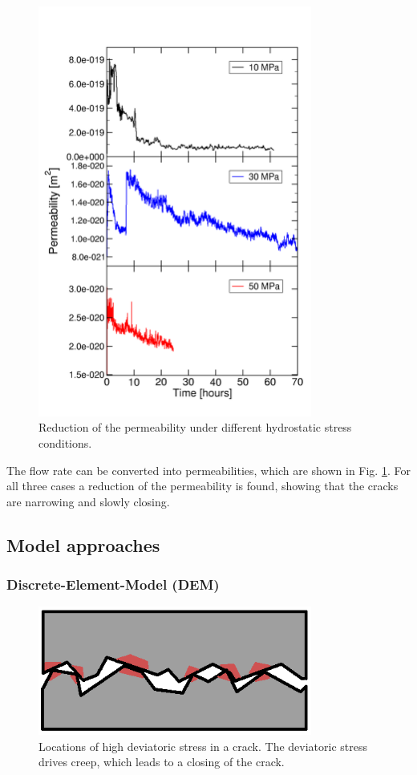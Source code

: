 \begin{figure}[!ht]
\centering
\includegraphics[width=9cm]{figures/mex3-perme-time-comparison.png}
\caption{Reduction of the permeability under different hydrostatic stress conditions.}
\label{fig:ME3-perme-exp}
\end{figure}

The flow rate can be converted into permeabilities, which are shown in Fig. \ref{fig:ME3-perme-exp}. For all three cases a reduction of the permeability is found,  showing that the cracks are narrowing and slowly closing. 
\subsection{Model approaches}
\subsubsection*{Discrete-Element-Model (DEM)}

\begin{figure}[!ht]
\centering
\includegraphics[width=9cm]{figures/mex3-crack-stresses.png}
\caption{Locations of high deviatoric stress in a crack. The deviatoric stress drives creep, which leads to a closing of the crack.}
\label{fig:ME3-crack-stre}
\end{figure}

